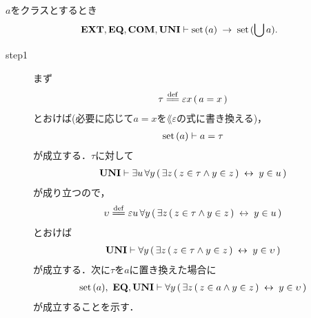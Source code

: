 	\begin{screen}
		\begin{thm}[集合の合併は集合]
		\label{thm:union_of_a_set_is_a_set}
			$a$をクラスとするとき
			\begin{align}
				\mbox{{\bf EXT}},\mbox{{\bf EQ}},\mbox{\bf COM},\mbox{{\bf UNI}} \vdash \operatorname*{set}\hspace{0.15em}(a) \hspace{0.25em}\rightarrow\hspace{0.25em} \operatorname*{set}\hspace{0.15em}(\bigcup a).
			\end{align}
		\end{thm}
	\end{screen}
	
	\begin{sketch}\mbox{}
		\begin{description}
			\item[step1]
				まず
				\begin{align}
					\tau \defeq \varepsilon x\, (\, a = x\, )
				\end{align}
				とおけば(必要に応じて$a = x$を$\lang{\varepsilon}$の式に書き換える)，
				\begin{align}
					\operatorname*{set}\hspace{0.15em}(a) \vdash a = \tau
				\end{align}
				が成立する．$\tau$に対して
				\begin{align}
					\mbox{{\bf UNI}} \vdash \exists u\, \forall y\, (\, \exists z\, (\, z \in \tau \wedge y \in z\, ) \hspace{0.25em}\leftrightarrow\hspace{0.25em} y \in u\, )
				\end{align}
				が成り立つので，
				\begin{align}
					\upsilon \defeq \varepsilon u\, \forall y\, (\, \exists z\, (\, z \in \tau \wedge y \in z\, ) \lrarrow y \in u\, )
				\end{align}
				とおけば
				\begin{align}
					\mbox{{\bf UNI}} \vdash \forall y\, (\, \exists z\, (\, z \in \tau \wedge y \in z\, ) \hspace{0.25em}\leftrightarrow\hspace{0.25em} y \in \upsilon\, )
					\label{fom:union_of_a_set_is_a_set_1}
				\end{align}
				が成立する．次に$\tau$を$a$に置き換えた場合に
				\begin{align}
					\operatorname*{set}\hspace{0.15em}(a),\ \mbox{{\bf EQ}},\mbox{{\bf UNI}} \vdash \forall y\, (\, \exists z\, (\, z \in a \wedge y \in z\, ) \hspace{0.25em}\leftrightarrow\hspace{0.25em} y \in \upsilon\, )
				\end{align}
				が成立することを示す．
				

\end{description}
\end{sketch}
